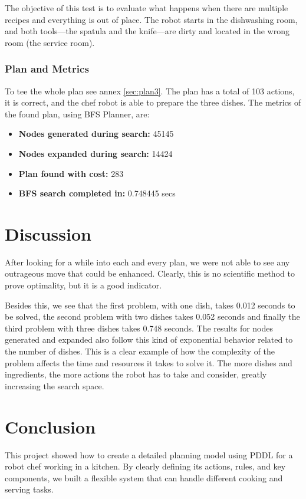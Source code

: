 \documentclass[a4paper,12pt]{article}
\begin{document}
The objective of this test is to evaluate what happens when there are multiple recipes and everything is out of place. The robot starts in the dishwashing room, and both tools—the spatula and the knife—are dirty and located in the wrong room (the service room).

\subsubsection{Plan and Metrics}
To tee the whole plan see annex \ref{sec:plan3}. The plan has a total of 103 actions, it is correct, and the chef robot is able to prepare the three dishes. The metrics of the found plan, using BFS Planner, are:

\begin{itemize}
    \item \textbf{Nodes generated during search:} 45145
    \item \textbf{Nodes expanded during search:} 14424
    \item \textbf{Plan found with cost:} 283
    \item \textbf{BFS search completed in:} 0.748445 secs
\end{itemize}


\section{Discussion}
\label{sec:discussion}
After looking for a while into each and every plan, we were not able to see any outrageous move that could be enhanced. Clearly, this is no scientific method to prove optimality, but it is a good indicator.

Besides this, we see that the first problem, with one dish, takes 0.012 seconds to be solved, the second problem with two dishes takes 0.052 seconds and finally the third problem with three dishes takes 0.748 seconds. The results for nodes generated and expanded also follow this kind of exponential behavior related to the number of dishes. This is a clear example of how the complexity of the problem affects the time and resources it takes to solve it. The more dishes and ingredients, the more actions the robot has to take and consider, greatly increasing the search space.


\section{Conclusion}
\label{sec:conclusion}
This project showed how to create a detailed planning model using PDDL for a robot chef working in a kitchen. By clearly defining its actions, rules, and key components, we built a flexible system that can handle different cooking and serving tasks. 
\end{document}
